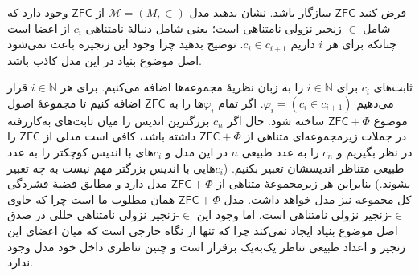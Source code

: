 فرض کنید
$\mathsf{ZFC}$
سازگار باشد.
نشان بدهید مدل
$\mathcal{M}=(M,\in)$
از
$\mathsf{ZFC}$
وجود دارد که شامل
$\in$-زنجیر
نزولی نامتناهی است؛ یعنی شامل دنبالهٔ نامتناهی
$c_i$
از اعضا است چنانکه برای هر
$i$
داریم
$c_i\in c_{i+1}$.
توضیح بدهید چرا وجود این زنجیره باعث نمی‌شود اصل موضوع بنیاد در این مدل کاذب باشد.
\begin{ans}
    ثابت‌های
    $c_i$
    برای
    $i\in\mathbb{N}$
    را به زبان نظریهٔ مجموعه‌ها اضافه می‌کنیم.
    برای هر
    $i\in\mathbb{N}$
    قرار می‌دهیم
    $\varphi_i=(c_i\in c_{i+1})$.
    اگر تمام
    $\varphi_i$ها
    را به
    $\mathsf{ZFC}$
    اضافه کنیم تا مجموعهٔ اصول موضوع
    $\mathsf{ZFC}+\Phi$
    ساخته شود. حال اگر
    $c_n$
    بزرگترین اندیس را میان ثابت‌های به‌کاررفته در جملات زیرمجموعه‌ای متناهی از
    $\mathsf{ZFC}+\Phi$
    داشته باشد، کافی است مدلی از
    $\mathsf{ZFC}$
    را در نظر بگیریم و
    $c_n$
    را به عدد طبیعی
    $n$
    در این مدل و
    $c_i$های با اندیس کوچکتر را به عدد طبیعی متناظر اندیسشان تعبیر بکنیم.
    ($c_i$هایی با اندیس بزرگتر مهم نیست به چه تعبیر بشوند.)
    بنابراین هر زیرمجموعهٔ متناهی از
    $\mathsf{ZFC}+\Phi$
    مدل دارد و مطابق قضیهٔ فشردگی کل مجموعه نیز مدل خواهد داشت. مدل
    $\mathsf{ZFC}+\Phi$
    همان مطلوب ما است چرا که حاوی
    $\in$-زنجیر نزولی نامتناهی است.
    اما وجود این
    $\in$-زنجیر نزولی نامتناهی خللی در صدق
    اصل موضوع بنیاد ایجاد نمی‌کند چرا که تنها از نگاه خارجی است که میان اعضای این زنجیر و اعداد طبیعی تناظر یک‌به‌یک برقرار است و چنین تناظری داخل خود مدل وجود ندارد.
\end{ans}